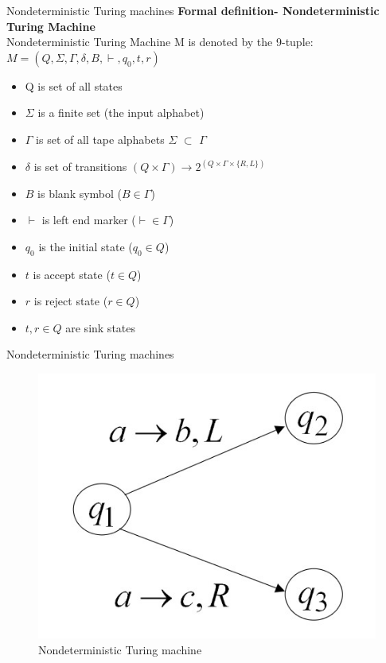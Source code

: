 \documentclass{beamer}
\begin{document}
\begin{frame}{Nondeterministic Turing machines}
	\textbf{Formal definition- Nondeterministic Turing Machine}\\
Nondeterministic Turing Machine M is denoted by the 9-tuple: $M=(Q,\Sigma, \Gamma, \delta,B,\vdash,q_0, t,r)$

\begin{itemize}
	\item Q is set of all states
	\item $\Sigma$ is a finite set (the input alphabet)
	\item $\Gamma$ is set of all tape alphabets $\Sigma$ $\subset$ $\Gamma$
	\item $\delta$ is set of transitions $(Q\times \Gamma)\rightarrow 2^{(Q\times \Gamma \times \{R,L\})}$
	\item $B$ is blank symbol ($B \in \Gamma$)
	\item $\vdash$ is left end marker  ($\vdash   \in \Gamma$)
	\item $q_0$ is the initial state ($q_0 \in Q$)
	\item $t$ is accept state ($t \in Q$)
	\item $r$ is reject state ($r \in Q$)
	\item $t,r \in Q$ are sink states
\end{itemize}
\end{frame}
\begin{frame}{Nondeterministic Turing machines}
	\begin{figure}
		\includegraphics[scale=.4]{img5/m17}
		\caption{Nondeterministic Turing machine}
	\end{figure}
\end{frame}
\end{document}
